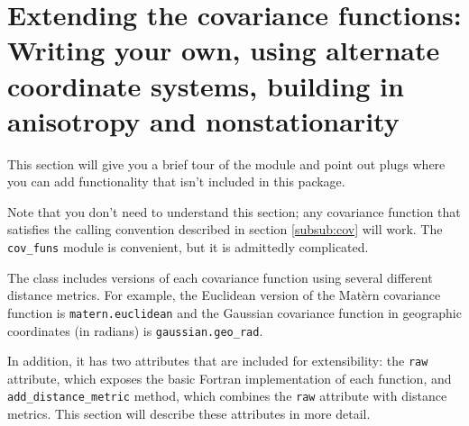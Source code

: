 \documentclass[]{manual}
\begin{document}
%

\section{Extending the covariance functions: Writing your own, using alternate coordinate systems, building in anisotropy and nonstationarity}\label{sec:usercov}
This section will give you a brief tour of the  module and point out plugs where you can add functionality that isn't included in this package.

\bigskip
Note that you don't need to understand this section; any covariance function that satisfies the calling convention described in section \ref{subsub:cov} will work. The \texttt{cov_funs} module is convenient, but it is admittedly complicated.

\bigskip
The  class includes versions of each covariance function using several different distance metrics. For example, the Euclidean version of the Mat\`ern covariance function is \texttt{matern.euclidean} and the Gaussian covariance function in geographic coordinates (in radians) is \texttt{gaussian.geo_rad}.

In addition, it has two attributes that are included for extensibility: the \texttt{raw} attribute, which exposes the basic Fortran implementation of each function, and \texttt{add_distance_metric} method, which combines the \texttt{raw} attribute with distance metrics. This section will describe these attributes in more detail.
\end{document}
